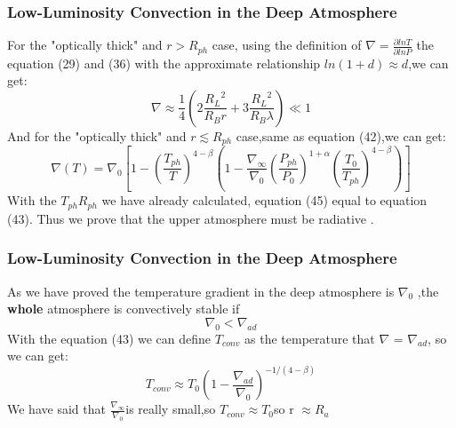 \documentclass{beamer}
\begin{document}
\begin{frame}
\frametitle{Low-Luminosity Convection in the Deep Atmosphere}
For the "optically thick" and $r > R_{ph}$ case, using the definition of $\nabla = \frac{\partial ln T}{\partial ln P}$ the equation (29) and (36) with the approximate relationship $ ln(1+d) \approx d$,we can get:
\begin{equation}
\nabla \approx \frac{1}{4}(2\frac{{R_L}^2}{R_B r}+3\frac{{R_L}^2}{R_B \lambda}) \ll 1
\end{equation}
And for the "optically thick" and $r \lesssim R_{ph}$ case,same as equation (42),we can get:
\begin{equation}
\nabla(T)=\nabla_0[1-(\frac{T_{ph}}{T})^{4-\beta}(1-\frac{\nabla_{\infty}}{\nabla_0}(\frac{P_{ph}}{P_0})^{1+\alpha}(\frac{T_0}{T_{ph}})^{4-\beta})]
\end{equation}
With the $ T_{ph} R_{ph}$ we have already calculated, equation (45) equal  to equation (43). Thus we prove that the upper atmosphere must be radiative .
\end{frame}

\begin{frame}
\frametitle{Low-Luminosity Convection in the Deep Atmosphere}
As we have proved the temperature gradient in the deep atmosphere is $\nabla_0$ ,the \textbf{whole} atmosphere is convectively stable if 
\begin{equation}
\nabla_0 < \nabla_{ad}
\end{equation}
With the equation (43) we can define $T_{conv} $ as the temperature that $\nabla $ = $\nabla_{ad}$, so we can get:
\begin{equation}
T_{conv} \approx T_0{(1-\frac{\nabla_{ad}}{\nabla_0})}^{-1/(4-\beta)}
\end{equation}
We have said that $\frac{\nabla_{\infty}}{\nabla_0}$is really small,so $T_{conv} \approx T_0 $so r $\approx R_a$
\end{frame}
\end{document}
